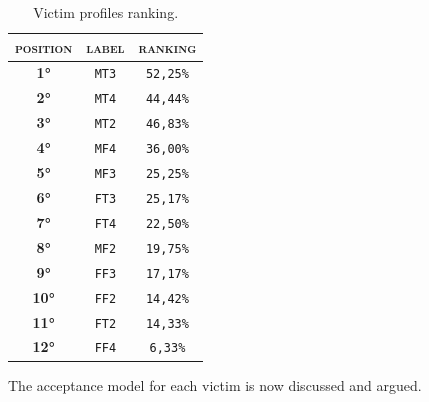 \begin{table}[H]
	\begin{center}
		\begin{tabular}[c]{ |c|c|c| } 
			\hline
			\cellcolor[HTML]{b0d7ff}\textsc{position} & 
			\cellcolor[HTML]{b0d7ff}\textsc{label}& 
			\cellcolor[HTML]{b0d7ff}\textsc{ranking}\\
			\hline 
			\textbf{\textsc{1°}}
			&\cellcolor[HTML]{e6f2ff}\texttt{MT3}
			& \texttt{52,25\%}\\	 
			\hline
			\textbf{\textsc{2°}}
			&\cellcolor[HTML]{e6f2ff}\texttt{MT4}
			& \texttt{44,44\%}\\	 
			\hline
			\textbf{\textsc{3°}}
			&\cellcolor[HTML]{e6f2ff}\texttt{MT2}
			& \texttt{46,83\%}\\	 
			\hline
			\textbf{\textsc{4°}}
			&\cellcolor[HTML]{e6f2ff}\texttt{MF4}
			& \texttt{36,00\%}\\	 
			\hline
			\textbf{\textsc{5°}}
			&\cellcolor[HTML]{e6f2ff}\texttt{MF3}
			& \texttt{25,25\%}\\	 
			\hline
			\textbf{\textsc{6°}}
			&\cellcolor[HTML]{e6f2ff}\texttt{FT3}
			& \texttt{25,17\%}\\	 
			\hline			
			\textbf{\textsc{7°}}
			&\cellcolor[HTML]{e6f2ff}\texttt{FT4}
			& \texttt{22,50\%}\\	 
			\hline			
			\textbf{\textsc{8°}}
			&\cellcolor[HTML]{e6f2ff}\texttt{MF2}
			& \texttt{19,75\%}\\	 
			\hline			
			\textbf{\textsc{9°}}
			&\cellcolor[HTML]{e6f2ff}\texttt{FF3}
			& \texttt{17,17\%}\\	 
			\hline
			\textbf{\textsc{10°}}
			&\cellcolor[HTML]{e6f2ff}\texttt{FF2}
			& \texttt{14,42\%}\\	 
			\hline
			\textbf{\textsc{11°}}
			&\cellcolor[HTML]{e6f2ff}\texttt{FT2}
			& \texttt{14,33\%}\\	 
			\hline
			\textbf{\textsc{12°}}
			&\cellcolor[HTML]{e6f2ff}\texttt{FF4}
			& \texttt{6,33\%}\\	 
			\hline
		\end{tabular}
	\end{center}
	\caption{Victim profiles ranking.}
	\label{table:ranking-victim}
\end{table}

\par \noindent The acceptance model for each victim is now discussed and argued.

